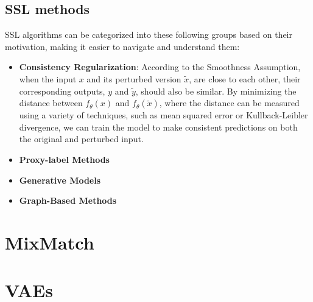 \subsection*{SSL methods}
SSL algorithms can be categorized into these following groups based on their motivation, making it easier to navigate and understand them\cite{ssl-overview-2020}:
\begin{itemize}
        \item \textbf{Consistency Regularization}: According to the Smoothness Assumption, when the input $x$ and its perturbed version $\tilde{x}$, 
        are close to each other, their corresponding outputs, $y$ and $\tilde{y}$, should also be similar. By minimizing the distance between 
        $f_\theta(x)$ and $f_\theta(\tilde{x})$, where the distance can be measured using a variety of techniques, such as mean squared error or 
        Kullback-Leibler divergence, we can train the model to make consistent predictions on both the original and perturbed input.
    \item \textbf{Proxy-label Methods}
    \item \textbf{Generative Models} 
    \item \textbf{Graph-Based Methods}
\end{itemize}
\section{MixMatch}
\section{VAEs}